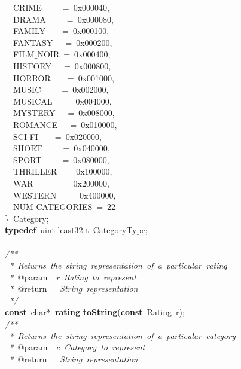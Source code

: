 \documentclass{article}
\begin{document}
\mbox{}\ \ CRIME\ \ \ \ \ =\ 0x000040, \\
\mbox{}\ \ DRAMA\ \ \ \ \ =\ 0x000080, \\
\mbox{}\ \ FAMILY\ \ \ \ =\ 0x000100, \\
\mbox{}\ \ FANTASY\ \ \ =\ 0x000200, \\
\mbox{}\ \ FILM$\_$NOIR\ =\ 0x000400, \\
\mbox{}\ \ HISTORY\ \ \ =\ 0x000800, \\
\mbox{}\ \ HORROR\ \ \ \ =\ 0x001000, \\
\mbox{}\ \ MUSIC\ \ \ \ \ =\ 0x002000, \\
\mbox{}\ \ MUSICAL\ \ \ =\ 0x004000, \\
\mbox{}\ \ MYSTERY\ \ \ =\ 0x008000, \\
\mbox{}\ \ ROMANCE\ \ \ =\ 0x010000, \\
\mbox{}\ \ SCI$\_$FI\ \ \ \ =\ 0x020000, \\
\mbox{}\ \ SHORT\ \ \ \ \ =\ 0x040000, \\
\mbox{}\ \ SPORT\ \ \ \ \ =\ 0x080000, \\
\mbox{}\ \ THRILLER\ \ =\ 0x100000, \\
\mbox{}\ \ WAR\ \ \ \ \ \ \ =\ 0x200000, \\
\mbox{}\ \ WESTERN\ \ \ =\ 0x400000, \\
\mbox{}\ \ NUM$\_$CATEGORIES\ =\ 22 \\
\mbox{}\}\ Category; \\
\mbox{}\textbf{typedef}\ uint$\_$least32$\_$t\ CategoryType; \\
\mbox{} \\
\mbox{}\textit{/**} \\
\mbox{}\textit{\ *\ Returns\ the\ string\ representation\ of\ a\ particular\ rating} \\
\mbox{}\textit{\ *\ }@param\textit{\ \ r\ Rating\ to\ represent} \\
\mbox{}\textit{\ *\ }@return\textit{\ \ \ String\ representation} \\
\mbox{}\textit{\ */} \\
\mbox{}\textbf{const}\ char*\ \textbf{rating$\_$toString}(\textbf{const}\ Rating\ r); \\
\mbox{}\textit{/**} \\
\mbox{}\textit{\ *\ Returns\ the\ string\ representation\ of\ a\ particular\ category} \\
\mbox{}\textit{\ *\ }@param\textit{\ \ c\ Category\ to\ represent} \\
\mbox{}\textit{\ *\ }@return\textit{\ \ \ String\ representation} \\
\end{document}
